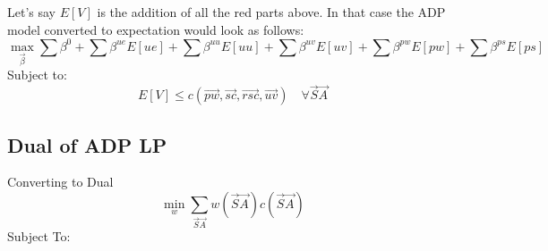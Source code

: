 \documentclass{article}
\begin{document}
Let's say $E[V]$ is the addition of all the red parts above. In that case the ADP model converted to expectation would look as follows:
\begin{equation}
	\max_{\vec{\beta}} \sum \beta^{0} + \sum \beta^{ue} E[ue] + \sum \beta^{uu} E[uu] + \sum \beta^{uv} E[uv] 
		+ \sum \beta^{pw} E[pw] + \sum \beta^{ps} E[ps]
\end{equation}
Subject to:
\begin{equation}
	E[V] \le c(\vec{pw}, \vec{sc}, \vec{rsc}, \vec{uv}) \quad \forall \vec{S} \vec{A} 
\end{equation}


\subsection{Dual of ADP LP}
\label{Dual of ADP LP}
Converting to Dual
\begin{equation}
	\min_{w} \sum_{\vec{S} \vec{A}} w(\vec{S} \vec{A}) c(\vec{S} \vec{A})
\end{equation}
Subject To:
\end{document}
